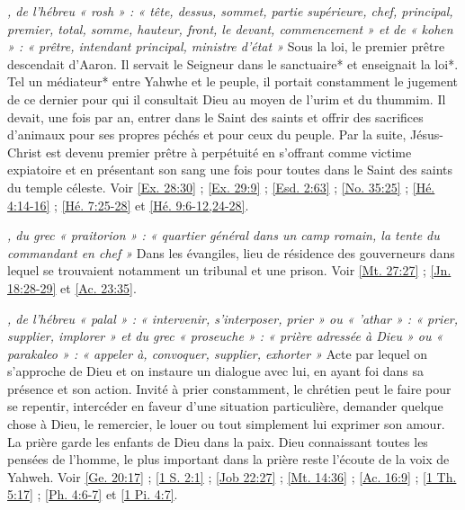 \begin{multicols}{2}
\textit{, de l'hébreu « rosh » : « tête, dessus, sommet, partie supérieure, chef, principal, premier, total, somme, hauteur, front, le devant, commencement » et de « kohen » : « prêtre, intendant principal, ministre d'état »}\newline
Sous la loi, le premier prêtre descendait d'Aaron. Il servait le Seigneur dans le sanctuaire* et enseignait la loi*. Tel un médiateur* entre Yahwhe et le peuple, il portait constamment le jugement de ce dernier pour qui il consultait Dieu au moyen de l'urim et du thummim. Il devait, une fois par an, entrer dans le Saint des saints et offrir des sacrifices d'animaux pour ses propres péchés et pour ceux du peuple. Par la suite, Jésus-Christ est devenu premier prêtre à perpétuité en s'offrant comme victime expiatoire et en présentant son sang une fois pour toutes dans le Saint des saints du temple céleste. Voir \vref{Ex. 28:30} ; \vref{Ex. 29:9} ; \vref{Esd. 2:63} ; \vref{No. 35:25} ; \vref{Hé. 4:14-16} ; \vref{Hé. 7:25-28} et \vref{Hé. 9:6-12,24-28}.

\textit{, du grec « praitorion » : « quartier général dans un camp romain, la tente du commandant en chef »}\newline
Dans les évangiles, lieu de résidence des gouverneurs dans lequel se trouvaient notamment un tribunal et une prison. Voir \vref{Mt. 27:27} ; \vref{Jn. 18:28-29} et \vref{Ac. 23:35}.

\textit{, de l'hébreu « palal » : « intervenir, s'interposer, prier » ou « 'athar » : « prier, supplier, implorer » et du grec « proseuche » : « prière adressée à Dieu » ou « parakaleo » : « appeler à, convoquer, supplier, exhorter »}\newline
Acte par lequel on s'approche de Dieu et on instaure un dialogue avec lui, en ayant foi dans sa présence et son action. Invité à prier constamment, le chrétien peut le faire pour se repentir, intercéder en faveur d'une situation particulière, demander quelque chose à Dieu, le remercier, le louer ou tout simplement lui exprimer son amour. La prière garde les enfants de Dieu dans la paix. Dieu connaissant toutes les pensées de l'homme, le plus important dans la prière reste l'écoute de la voix de Yahweh. Voir \vref{Ge. 20:17} ; \vref{1 S. 2:1} ; \vref{Job 22:27} ; \vref{Mt. 14:36} ; \vref{Ac. 16:9} ; \vref{1 Th. 5:17} ; \vref{Ph. 4:6-7} et \vref{1 Pi. 4:7}.


\end{multicols}

